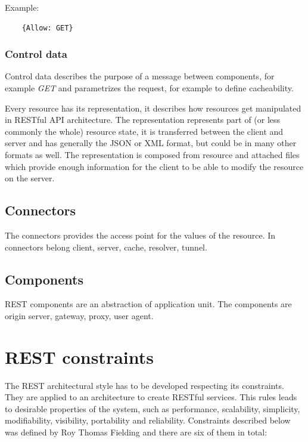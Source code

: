   Example: 
  \begin{center}
  \begin{lstlisting}
    {Allow: GET}
  \end{lstlisting}
  \end{center}
  
\subsubsection{Control data}
  Control data describes the purpose of a message between components, for example \emph{GET} and parametrizes the request, for example to define cacheability. 
  
\bigskip

  Every resource has its representation, it describes how resources get manipulated in RESTful API architecture. The representation represents part of (or less commonly the whole) resource state, it is transferred between the client and server and has generally the JSON or XML format, but could be in many other formats as well. The representation is composed from resource and attached files which provide enough information for the client to be able to modify the resource on the server.

\subsection{Connectors}
The connectors provides the access point for the values of the resource. In connectors belong client, server, cache, resolver, tunnel. %

\subsection{Components}
REST components are an abstraction of application unit. The components are origin server, gateway, proxy, user agent. %

\section{REST constraints}
\label{sec:constraints}

The REST architectural style has to be developed respecting its constraints. They are applied to an architecture to create RESTful services. This rules leads to desirable properties of the system, such as performance, scalability, simplicity, modifiability, visibility, portability and reliability. Constraints described below was defined by Roy Thomas Fielding and there are six of them in total:
 
